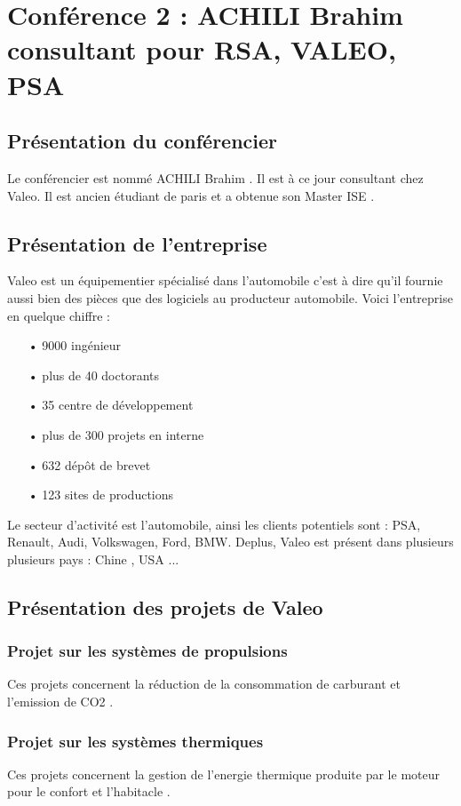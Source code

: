  \section{Conférence 2 : ACHILI Brahim consultant pour RSA, VALEO, PSA}
 
 	\subsection{Présentation du conférencier}
 Le conférencier est nommé  ACHILI Brahim . Il est à ce jour consultant chez Valeo. Il est ancien étudiant de paris et a obtenue son Master ISE . 
 	\subsection{Présentation de l'entreprise}
 	Valeo est un équipementier spécialisé dans l'automobile c'est à dire qu'il fournie aussi bien des pièces que des logiciels au producteur automobile. Voici l'entreprise en quelque chiffre : 
 	\begin{itemize}
 		\item[•] 9000 ingénieur 
 		\item[•] plus de 40 doctorants 
 		\item[•] 35 centre de développement
 		\item[•] plus de 300 projets en interne
 		\item[•] 632 dépôt de brevet 
 		\item[•] 123 sites de productions
	\end{itemize} 	 
	Le secteur d'activité est l'automobile, ainsi les clients potentiels sont : PSA, Renault, Audi, Volkswagen, Ford, BMW. Deplus, Valeo est présent dans plusieurs plusieurs pays : Chine , USA ...\\
	
 	\subsection{Présentation des projets de Valeo}
 		\subsubsection{Projet sur les systèmes de propulsions}
 		Ces projets concernent la réduction de la consommation de carburant et l'emission de CO2 . 
 		\subsubsection{Projet sur les systèmes thermiques}
 		Ces projets concernent la gestion de l'energie thermique produite par le moteur pour le confort et l'habitacle .
